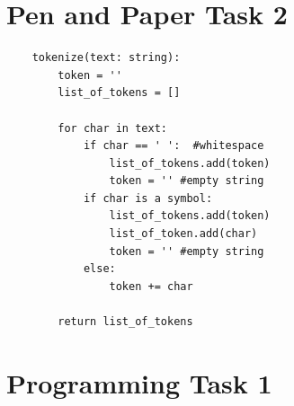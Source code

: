 \documentclass[a4paper]{scrartcl}
\begin{document}
\clearpage
\section*{Pen and Paper Task 2}

\begin{lstlisting}
    tokenize(text: string):
        token = ''
        list_of_tokens = []

        for char in text:
            if char == ' ':  #whitespace
                list_of_tokens.add(token)
                token = '' #empty string
            if char is a symbol:
                list_of_tokens.add(token)
                list_of_token.add(char)
                token = '' #empty string
            else:
                token += char
                
        return list_of_tokens

\end{lstlisting}

\clearpage
\section*{Programming Task 1}

\end{document}
